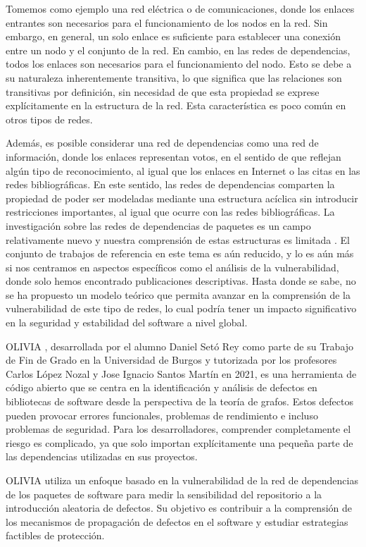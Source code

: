 Tomemos como ejemplo una red eléctrica o de comunicaciones, donde los enlaces entrantes son necesarios para el funcionamiento de los nodos en la red.
Sin embargo, en general, un solo enlace es suficiente para establecer una conexión entre un nodo y el conjunto de la red.
En cambio, en las redes de dependencias, todos los enlaces son necesarios para el funcionamiento del nodo.
Esto se debe a su naturaleza inherentemente transitiva, lo que significa que las relaciones son transitivas por definición, 
sin necesidad de que esta propiedad se exprese explícitamente en la estructura de la red. 
Esta característica es poco común en otros tipos de redes.

Además, es posible considerar una red de dependencias como una red de información, donde los enlaces representan votos, en el sentido de
que reflejan algún tipo de reconocimiento, al igual que los enlaces en Internet o las citas en las redes bibliográficas. En este sentido,
las redes de dependencias comparten la propiedad de poder ser modeladas mediante una estructura acíclica sin introducir restricciones importantes,
al igual que ocurre con las redes bibliográficas.
La investigación sobre las redes de dependencias de paquetes es un campo relativamente nuevo y nuestra comprensión de estas
estructuras es limitada \cite{7962360}. El conjunto de trabajos de referencia en este tema es aún reducido, y lo es aún más
si nos centramos en aspectos específicos como el análisis de la vulnerabilidad, donde solo hemos encontrado publicaciones 
descriptivas. Hasta donde se sabe, no se ha propuesto un modelo teórico que permita avanzar en la comprensión de la 
vulnerabilidad de este tipo de redes, lo cual podría tener un impacto significativo en la seguridad y estabilidad del
 software a nivel global. 


OLIVIA \cite{daniel_2022_7358391}, desarrollada por el alumno Daniel Setó Rey como parte de su Trabajo de Fin de Grado en la Universidad de Burgos y tutorizada por los profesores Carlos López Nozal y Jose Ignacio Santos Martín en 2021, es una herramienta de código abierto que se centra en la identificación y análisis de defectos en bibliotecas de software desde la perspectiva de la teoría de grafos. Estos defectos pueden provocar errores funcionales, problemas de rendimiento e incluso problemas de seguridad. Para los desarrolladores, comprender completamente el riesgo es complicado, ya que solo importan explícitamente una pequeña parte de las dependencias utilizadas en sus proyectos.


OLIVIA utiliza un enfoque basado en la vulnerabilidad de la red de dependencias de los paquetes de software para medir la sensibilidad del repositorio a la introducción aleatoria de defectos. Su objetivo es contribuir a la comprensión de los mecanismos de propagación de defectos en el software y estudiar estrategias factibles de protección.

